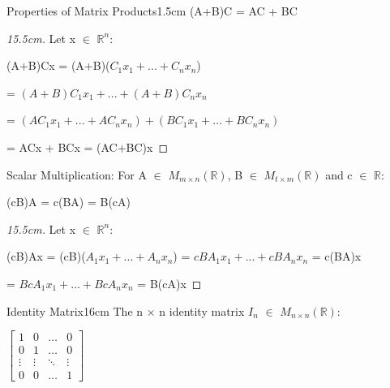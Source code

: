 \begin{ltheorem}{Properties of Matrix Products}{1.5cm}
            \hspace{0.5cm}
            (A+B)C = AC + BC

            \begin{proof}[15.5cm]
                Let x $\in$ $\mathbb{R}^n$:

                \hspace{0.5cm}
                (A+B)Cx
                = (A+B)($C_1x_1 + ... + C_nx_n$)
                
                \hspace{2.4cm}
                = $(A+B)C_1x_1 + ... + (A+B)C_nx_n$

                \hspace{2.4cm}
                = $(AC_1x_1 + ... + AC_nx_n) + (BC_1x_1 + ... + BC_nx_n)$

                \hspace{2.4cm}
                = ACx + BCx
                = (AC+BC)x
            \end{proof}

        \item {\color{lgreen} Scalar Multiplication}:
            For A $\in$ $M_{m \times n}(\mathbb{R})$,
            B $\in$ $M_{t \times m}(\mathbb{R})$ and
            c $\in$ $\mathbb{R}$:

            \hspace{0.5cm}
            (cB)A = c(BA) = B(cA)

            \begin{proof}[15.5cm]
                Let x $\in$ $\mathbb{R}^n$:

                \hspace{0.5cm}
                (cB)Ax
                = (cB)($A_1x_1 + ... + A_nx_n$)
                = $cBA_1x_1 + ... + cBA_nx_n$
                = c(BA)x

                \hspace{6.9cm}
                = $BcA_1x_1 + ... + BcA_nx_n$
                = B(cA)x
            \end{proof}
    \end{ltheorem}

    \vspace{0.5cm}



    \begin{definition}{Identity Matrix}{16cm}
        The n $\times$ n {\color{lblue} identity matrix} $I_n$
        $\in$ $M_{n \times n}(\mathbb{R})$:

        \hspace{0.5cm}
        $\begin{bmatrix}
            1 & 0 & \hdots & 0 \\
            0 & 1 & \hdots & 0 \\
            \vdots & \vdots & \ddots & \vdots \\
            0 & 0 & \hdots & 1
        \end{bmatrix}$
    \end{definition}

